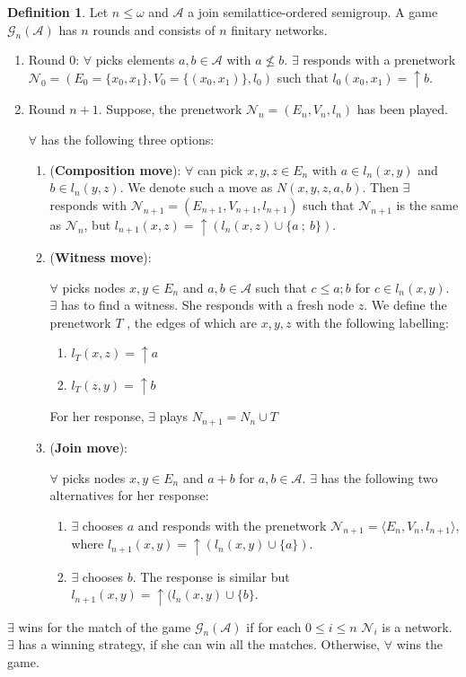 \documentclass[a4paper]{article}
\theoremstyle{definition}
\newtheorem{definition}{Definition}
\theoremstyle{theorem}
\theoremstyle{proposition}
\theoremstyle{lemma}
\theoremstyle{ex}
\theoremstyle{corollary}
\theoremstyle{claim}
\begin{document}
\begin{definition}
  Let $n \leq \omega$ and $\mathcal{A}$ a join semilattice-ordered semigroup. A game $\mathcal{G}_n(\mathcal{A})$ has $n$ rounds and consists of $n$ finitary networks.

  \begin{enumerate}
    \item Round $0$: $\forall$ picks elements $a, b \in \mathcal{A}$ with $a \not\leq b$. $\exists$ responds with a prenetwork $\mathcal{N}_0 = (E_0 = \{ x_0, x_1 \}, V_0 = \{ (x_0, x_1)\}, l_0)$ such that $l_0(x_0, x_1) = \uparrow b$.
    \item Round $n + 1$. Suppose, the prenetwork $\mathcal{N}_n = (E_n, V_n, l_n)$ has been played.

    $\forall$ has the following three options:
    \begin{enumerate}
      \item ({\bf Composition move}): $\forall$ can pick $x, y, z \in E_n$ with $a \in l_n(x, y)$ and $b \in l_n(y, z)$. We denote such a move as $N(x,y,z,a,b)$. Then $\exists$ responds with $\mathcal{N}_{n + 1} = (E_{n + 1}, V_{n + 1}, l_{n + 1})$ such that $\mathcal{N}_{n + 1}$
      is the same as $\mathcal{N}_n$, but $l_{n + 1}(x, z) = \uparrow (l_{n}(x, z) \cup \{ a \: ; \: b\})$.
      \item ({\bf Witness move}):

      $\forall$ picks nodes $x, y \in E_n$ and $a, b \in \mathcal{A}$ such that $c \leq a ; b$ for $c \in l_n(x, y)$. $\exists$ has to find a witness. She responds with a fresh node $z$. We define the prenetwork $T$ , the edges of which are $x, y, z$ with the following labelling:
      \begin{enumerate}
        \item $l_T(x, z) = \uparrow a$
        \item $l_T(z, y) = \uparrow b$
      \end{enumerate}
      For her response, $\exists$ plays $N_{n + 1} = N_n \cup T$
      \item ({\bf Join move}):

      $\forall$ picks nodes $x, y \in E_n$ and $a + b$ for $a, b \in \mathcal{A}$. $\exists$ has the following two alternatives for her response:
      \begin{enumerate}
        \item $\exists$ chooses $a$ and responds with the prenetwork $\mathcal{N}_{n + 1} = \langle E_n, V_{n}, l_{n + 1} \rangle$, where $l_{n+1}(x, y) = \uparrow (l_n(x,y) \cup \{ a \})$.
        \item $\exists$ chooses $b$. The response is similar but $l_{n + 1}(x, y) = \uparrow (l_n(x,y) \cup \{ b \}$.
      \end{enumerate}
    \end{enumerate}
  \end{enumerate}

  $\exists$ wins for the match of the game $\mathcal{G}_n(\mathcal{A})$ if for each $0 \leq i \leq n$ $\mathcal{N}_i$ is a network. $\exists$ has a winning strategy, if she can win all the matches. Otherwise, $\forall$ wins the game.
\end{definition}
\end{document}
